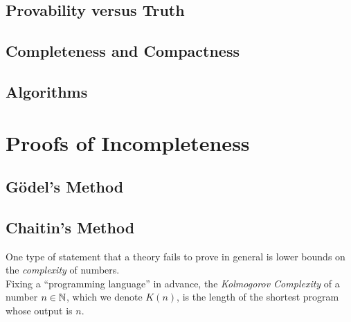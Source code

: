 \documentclass{amsart}
\begin{document}
	
	\newpage 
	
	\subsection{Provability versus Truth}
	
	\newpage
	
	\subsection{Completeness and Compactness}
	
	\newpage 
	
	\subsection{Algorithms}
	
	\newpage
	
	\section{Proofs of Incompleteness}
	
	\subsection{G\"odel's Method}
	
	\subsection{Chaitin's Method} One type of statement that a theory fails to prove in general is lower bounds on the \textit{complexity} of numbers. \\
	
	Fixing a ``programming language'' in advance, the \textit{Kolmogorov Complexity} of a number $n\in \mathbb{N}$, which we denote $K(n)$, is the length of the shortest program whose output is $n$.\\
	
\end{document}
